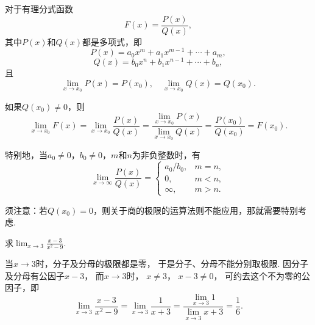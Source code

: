 \begin{example}
对于有理分式函数\[
F(x) = \frac{P(x)}{Q(x)},
\]其中\(P(x)\)和\(Q(x)\)都是多项式，即\[
P(x) = a_0 x^m + a_1 x^{m-1} + \dotsb + a_m,
\]\[
Q(x) = b_0 x^n + b_1 x^{n-1} + \dotsb + b_n,
\]且\[
\lim_{x \to x_0} P(x) = P(x_0),
\quad
\lim_{x \to x_0} Q(x) = Q(x_0).
\]

如果\(Q(x_0) \neq 0\)，则\[
\lim_{x \to x_0} F(x)
= \lim_{x \to x_0} \frac{P(x)}{Q(x)}
= \frac{\lim_{x \to x_0} P(x)}{\lim_{x \to x_0} Q(x)}
= \frac{P(x_0)}{Q(x_0)}
= F(x_0).
\]

特别地，当\(a_0\neq0\)，\(b_0\neq0\)，\(m\)和\(n\)为非负整数时，有
\[
\lim_{x\to\infty}\frac{P(x)}{Q(x)} = \left\{ \begin{array}{cl}
a_0/b_0, & m=n, \\
0, & m<n, \\
\infty, & m>n.
\end{array} \right.
\]
\end{example}
须注意：若\(Q(x_0) = 0\)，则关于商的极限的运算法则不能应用，那就需要特别考虑.

\begin{example}
求\(\lim_{x\to3}\frac{x-3}{x^2-9}\).
\begin{solution}
当\(x\to3\)时，分子及分母的极限都是零，
于是分子、分母不能分别取极限.
因分子及分母有公因子\(x - 3\)，
而\(x\to3\)时，
\(x \neq 3\)，
\(x - 3 \neq 0\)，
可约去这个不为零的公因子，即\[
	\lim_{x\to3}\frac{x - 3}{x^2 - 9}
	= \lim_{x\to3}\frac{1}{x + 3}
	= \frac{\lim_{x\to3} 1}{\lim_{x\to3} x+3}
	= \frac{1}{6}.
\]
\end{solution}
\end{example}

